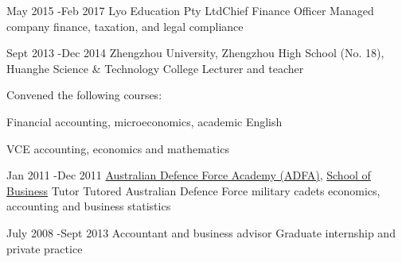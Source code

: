 \documentclass[10pt]{article} %
\begin{document}
\job
{May 2015 -}{Feb 2017}
{Lyo Education Pty Ltd}{}{Chief Finance Officer}{
Managed company finance, taxation, and legal compliance
}

\job
{Sept 2013 -}{Dec 2014}
{Zhengzhou University, Zhengzhou High School (No. 18), Huanghe Science \& Technology College}
{}
{Lecturer and teacher}
{Convened the following courses:
\begin{itemize-noindent}\setlength\itemsep{0pt}
\item{Financial accounting, microeconomics, academic English}
\item{VCE accounting, economics and mathematics}
\end{itemize-noindent}
}

\job
{Jan 2011 -}{Dec 2011}
{\href{http://www.defence.gov.au/ADFA/}{Australian Defence Force Academy (ADFA)}, \href{https://www.unsw.adfa.edu.au/sbus}{School of Business}}
{}
{Tutor}
{Tutored Australian Defence Force military cadets economics, accounting and business statistics
}






\job
{July 2008 -}{Sept 2013}
{Accountant and business advisor}
{}
{Graduate internship and private practice}
{

}

\end{document}
